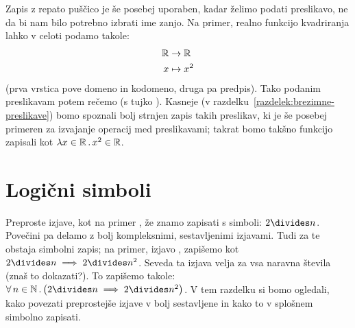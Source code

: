 \begin{itemize}
                                Zapis z repato puščico je še posebej uporaben, kadar želimo podati preslikavo, ne da bi nam bilo potrebno izbrati ime zanjo. Na primer, realno funkcijo kvadriranja lahko v celoti podamo takole:
                                \begin{align*}
                                        \mathbb{R} &\to \mathbb{R} \\
                                        x &\mapsto x^2
                                \end{align*}
                                (prva vrstica pove domeno in kodomeno, druga pa predpis). Tako podanim preslikavam potem rečemo  (s tujko ). Kasneje (v razdelku~\ref{razdelek:brezimne-preslikave}) bomo spoznali bolj strnjen zapis takih preslikav, ki je še posebej primeren za izvajanje operacij med preslikavami; takrat bomo takšno funkcijo zapisali kot $\xlam{x}[\RR]{x^2}[\RR]$.
                \end{itemize}




        \section{Logični simboli}\label{razdelek:logicni-simboli}

                Preproste izjave, kot na primer , že znamo zapisati s simboli: $2 \divides n$. Povečini pa delamo z bolj kompleksnimi, sestavljenimi izjavami. Tudi za te obstaja simbolni zapis; na primer, izjavo , zapišemo kot $2 \divides n \implies 2 \divides n^2$. Seveda ta izjava velja za vsa naravna števila (znaš to dokazati?). To zapišemo takole: $\all{n}[\NN]{2 \divides n \implies 2 \divides n^2}$. V tem razdelku si bomo ogledali, kako povezati preprostejše izjave v bolj sestavljene in kako to v splošnem simbolno zapisati.

